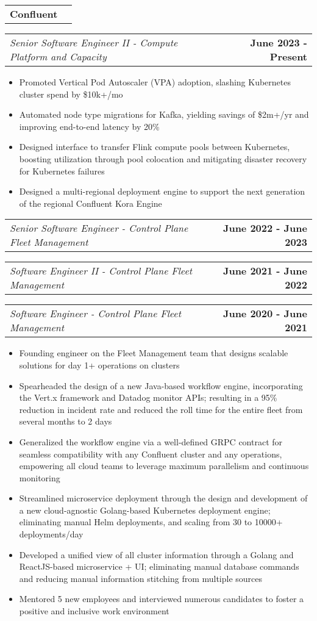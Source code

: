 \documentclass[letterpaper,10.8pt]{article}
\makeatletter
\newcommand{\resumeItemOne}[1]{
  \item[$\circ$]\small{{#1 \vspace{-2pt}}
  }
}
\newcommand{\resumeSubheadingCompanyOnly}[1]{
  \vspace{-2pt}\item[$ $]
    \begin{tabular*}{0.97\textwidth}{l@{\extracolsep{\fill}}r}
      \textbf{#1} \\
    \end{tabular*}
  \vspace{-7pt}
}
\newcommand{\resumeSubheadingTitleOnly}[2]{
  \vspace{-2pt}\item[$ $]
    \begin{tabular*}{0.97\textwidth}{l@{\extracolsep{\fill}}r}
      \textit{\small #1} & \textbf{\small #2} \\
    \end{tabular*}
  \vspace{-7pt}
}
\newcommand{\resumeItemListStart}{\begin{itemize}}
\newcommand{\resumeItemListEnd}{\end{itemize}\vspace{-5pt}}
\makeatother
\begin{document}
    \resumeSubheadingCompanyOnly {Confluent}
    \resumeSubheadingTitleOnly
    {Senior Software Engineer II - Compute Platform and Capacity}{June 2023 - Present}
    \resumeItemListStart
      \resumeItemOne{Promoted Vertical Pod Autoscaler (VPA) adoption, slashing Kubernetes cluster spend by \$10k+/mo}
      \resumeItemOne{Automated node type migrations for Kafka, yielding savings of \$2m+/yr and improving end-to-end latency by 20\%} 
      \resumeItemOne{Designed interface to transfer Flink compute pools between Kubernetes, boosting utilization through pool colocation and mitigating disaster recovery for Kubernetes failures}
      \resumeItemOne{Designed a multi-regional deployment engine to support the next generation of the regional Confluent Kora Engine}
    \resumeItemListEnd
    \resumeSubheadingTitleOnly
    {Senior Software Engineer - Control Plane Fleet Management}{June 2022 - June 2023}
    \resumeSubheadingTitleOnly
    {Software Engineer II - Control Plane Fleet Management}{June 2021 - June 2022}
    \resumeSubheadingTitleOnly
    {Software Engineer - Control Plane Fleet Management}{June 2020 - June 2021}
    \resumeItemListStart
      \resumeItemOne{Founding engineer on the Fleet Management team that designs scalable solutions for day 1+ operations on clusters}
      \resumeItemOne{Spearheaded the design of a new Java-based workflow engine, incorporating the Vert.x framework and Datadog monitor APIs; resulting in a 95\% reduction in incident rate and reduced the roll time for the entire fleet from several months to 2 days}
      \resumeItemOne{Generalized the workflow engine via a well-defined GRPC contract for seamless compatibility with any Confluent cluster and any operations, empowering all cloud teams to leverage maximum parallelism and continuous monitoring}
      \resumeItemOne{Streamlined microservice deployment through the design and development of a new cloud-agnostic Golang-based Kubernetes deployment engine; eliminating manual Helm deployments, and scaling from 30 to 10000+ deployments/day}
      \resumeItemOne{Developed a unified view of all cluster information through a Golang and ReactJS-based microservice + UI; eliminating manual database commands and reducing manual information stitching from multiple sources}
      \resumeItemOne{Mentored 5 new employees and interviewed numerous candidates to foster a positive and inclusive work environment}
  \resumeItemListEnd
\end{document}
